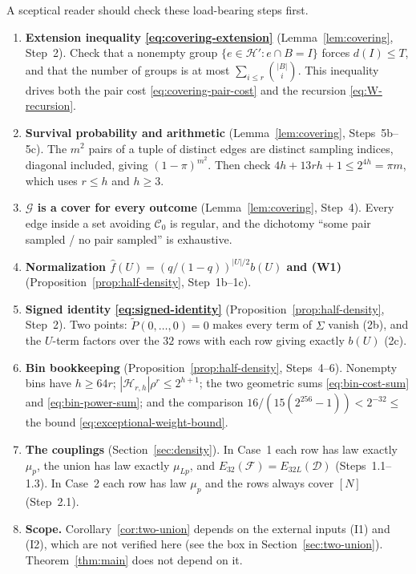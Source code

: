 \documentclass[11pt,letterpaper]{article}
\theoremstyle{definition}
\theoremstyle{remark}
\numberwithin{equation}{section}
\begin{document}
A sceptical reader should check these load-bearing steps first.

\begin{enumerate}
\item \textbf{Extension inequality \eqref{eq:covering-extension}}
(Lemma~\ref{lem:covering}, Step~2). Check that a nonempty group
$\{e\in\mathcal H':e\cap B=I\}$ forces $d(I)\le T$, and that the number of
groups is at most $\sum_{i\le r}\binom{|B|}{i}$. This inequality drives
both the pair cost \eqref{eq:covering-pair-cost} and the recursion
\eqref{eq:W-recursion}.
\item \textbf{Survival probability and arithmetic}
(Lemma~\ref{lem:covering}, Steps~5b--5c). The $m^2$ pairs of a tuple of
distinct edges are distinct sampling indices, diagonal included, giving
$(1-\pi)^{m^2}$. Then check $4h+13rh+1\le2^{4h}=\pi m$, which uses
$r\le h$ and $h\ge3$.
\item \textbf{$\mathcal G$ is a cover for every outcome}
(Lemma~\ref{lem:covering}, Step~4). Every edge inside a set avoiding
$\mathcal C_0$ is regular, and the dichotomy ``some pair sampled / no pair
sampled'' is exhaustive.
\item \textbf{Normalization
$\widehat f(U)=(q/(1-q))^{|U|/2}b(U)$ and (W1)}
(Proposition~\ref{prop:half-density}, Step~1b--1c).
\item \textbf{Signed identity \eqref{eq:signed-identity}}
(Proposition~\ref{prop:half-density}, Step~2). Two points:
$\widetilde P(0,\ldots,0)=0$ makes every term of $\Sigma$ vanish (2b),
and the $U$-term factors over the $32$ rows with each row giving exactly
$b(U)$ (2c).
\item \textbf{Bin bookkeeping}
(Proposition~\ref{prop:half-density}, Steps~4--6). Nonempty bins have
$h\ge64r$; $|\mathcal H_{r,h}|\rho^r\le2^{h+1}$; the two geometric sums
\eqref{eq:bin-cost-sum} and \eqref{eq:bin-power-sum}; and the comparison
$16/(15(2^{256}-1))<2^{-32}\le$ the bound
\eqref{eq:exceptional-weight-bound}.
\item \textbf{The couplings} (Section~\ref{sec:density}). In Case~1 each
row has law exactly $\mu_p$, the union has law exactly $\mu_{Lp}$, and
$E_{32}(\mathcal F)=E_{32L}(\mathcal D)$ (Steps~1.1--1.3). In Case~2 each
row has law $\mu_p$ and the rows always cover $[N]$ (Step~2.1).
\item \textbf{Scope.} Corollary~\ref{cor:two-union} depends on the
external inputs (I1) and (I2), which are not verified here (see the box in
Section~\ref{sec:two-union}). Theorem~\ref{thm:main} does not depend on
it.
\end{enumerate}
\end{document}
